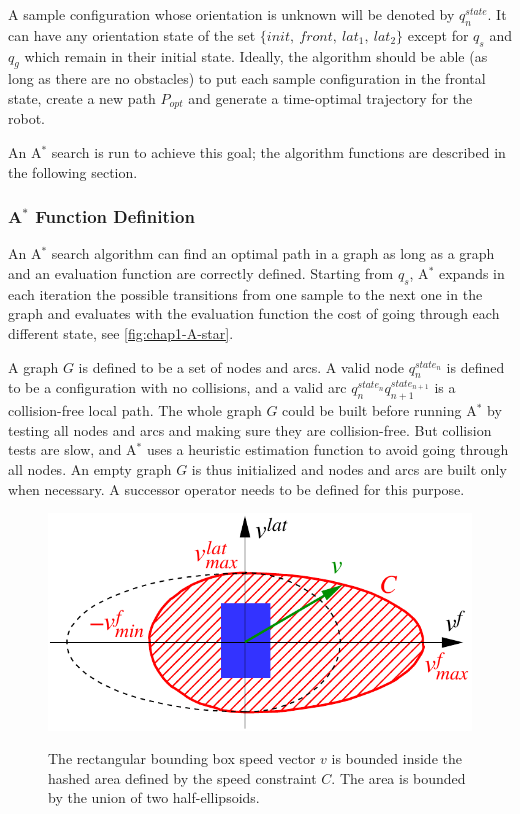 A sample configuration whose orientation is unknown will be denoted by
$q_n^{state}$. It can have any orientation state of the set
$\{init,~front,~lat_1,~lat_2\}$ except for $q_s$ and $q_g$ which
remain in their initial state.  Ideally, the algorithm should be able
(as long as there are no obstacles) to put each sample configuration
in the frontal state, create a new path $P_{opt}$ and generate a
time-optimal trajectory for the robot.

An A$^{*}$ search is run to achieve this goal; the algorithm functions are
described in the following section.

\subsubsection{A$^{*}$ Function Definition}
\label{sec:chap1-A-star}
An A$^{*}$ search algorithm can find an optimal path in a graph
as long as a graph and an evaluation function are correctly
defined. Starting from $q_s$, A$^{*}$ expands in each iteration the
possible transitions from one sample to the next one in the graph and
evaluates with the evaluation function the cost of going through each
different state, see \autoref{fig:chap1-A-star}.

A graph $G$ is defined to be a set of nodes and arcs. A valid node
$q_n^{state_n}$ is defined to be a configuration with no collisions,
and a valid arc $q_n^{state_n}q_{n+1}^{state_{n+1}}$ is a
collision-free local path. The whole graph $G$ could be built before
running A$^{*}$ by testing all nodes and arcs and making sure they are
collision-free. But collision tests are slow, and A$^{*}$ uses a heuristic
estimation function to avoid going through all nodes. An empty graph
$G$ is thus initialized and nodes and arcs are built only when
necessary. A successor operator needs to be defined for this purpose.

\begin{figure}
  \centering
      {\includegraphics[width = 0.75\linewidth]
        {src/chap1-path-optimization/elliptic-constraint.pdf}}
      \caption{The rectangular bounding box speed vector $v$ is
        bounded inside the hashed area defined by the speed constraint
        $C$. The area is bounded by the union of two half-ellipsoids.}
      \label{fig:chap1-elliptic-constraint}
\end{figure}

